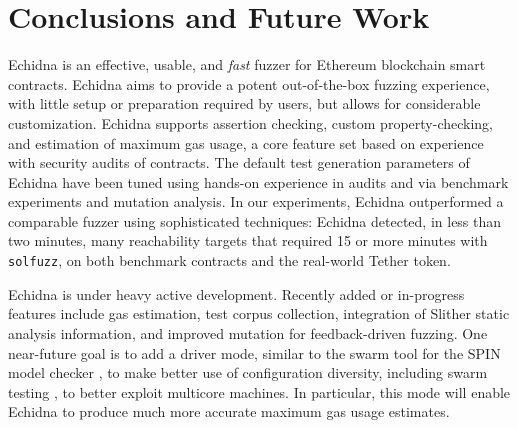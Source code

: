 \section{Conclusions and Future Work}

Echidna is an effective, usable, and \emph{fast} fuzzer for Ethereum blockchain smart contracts.  Echidna aims to provide a potent out-of-the-box fuzzing experience, with little setup or preparation required by users, but allows for considerable customization.  Echidna supports assertion checking, custom property-checking, and estimation of maximum gas usage, a core feature set based on experience with security audits of contracts.  The default test generation parameters of Echidna have been tuned using hands-on experience in audits and via benchmark experiments and mutation analysis.  In our experiments, Echidna outperformed a comparable fuzzer using sophisticated techniques:  Echidna detected, in less than two minutes, many reachability targets that required 15 or more minutes with {\tt solfuzz}, on both benchmark contracts and the real-world Tether token.

Echidna is under heavy active development.  Recently added or in-progress features include gas estimation, test corpus collection, integration of Slither static analysis information, and improved mutation for feedback-driven fuzzing.  One near-future goal is to add a driver mode, similar to the swarm tool \cite{swarmIEEE}  for the SPIN model checker \cite{SPIN}, to make better use of configuration diversity, including swarm testing \cite{ISSTA12}, to better exploit multicore machines.  In particular, this mode will enable Echidna to produce much more accurate maximum gas usage estimates.